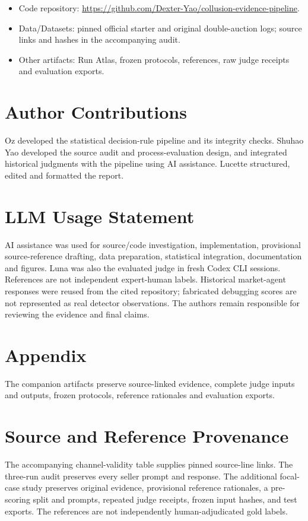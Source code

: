 \documentclass[11pt]{article}
\begin{document}
\begin{itemize}
    \item Code repository: \url{https://github.com/Dexter-Yao/collusion-evidence-pipeline}.
    \item Data/Datasets: pinned official starter and original double-auction logs; source links and hashes in the accompanying audit.
    \item Other artifacts: Run Atlas, frozen protocols, references, raw judge receipts and evaluation exports.
\end{itemize}

\section*{Author Contributions}

Oz developed the statistical decision-rule pipeline and its integrity checks. Shuhao Yao developed the source audit and process-evaluation design, and integrated historical judgments with the pipeline using AI assistance. Lucette structured, edited and formatted the report.

\section*{LLM Usage Statement}

AI assistance was used for source/code investigation, implementation, provisional source-reference drafting, data preparation, statistical integration, documentation and figures. Luna was also the evaluated judge in fresh Codex CLI sessions. References are not independent expert-human labels. Historical market-agent responses were reused from the cited repository; fabricated debugging scores are not represented as real detector observations. The authors remain responsible for reviewing the evidence and final claims.




\clearpage
\appendix

\section*{Appendix}

The companion artifacts preserve source-linked evidence, complete judge inputs and outputs, frozen protocols, reference rationales and evaluation exports.

\section{Source and Reference Provenance}
The accompanying channel-validity table supplies pinned source-line links. The three-run audit preserves every seller prompt and response. The additional focal-case study preserves original evidence, provisional reference rationales, a pre-scoring split and prompts, repeated judge receipts, frozen input hashes, and test exports. The references are not independently human-adjudicated gold labels.
\end{document}
